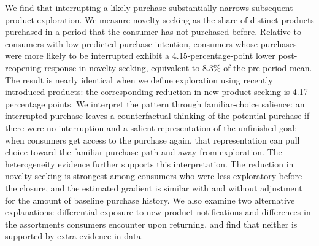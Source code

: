 \documentclass[11 pt]{article}
\begin{document}
We find that interrupting a likely purchase substantially narrows subsequent product exploration. We measure novelty-seeking as the share of distinct products purchased in a period that the consumer has not purchased before. Relative to consumers with low predicted purchase intention, consumers whose purchases were more likely to be interrupted exhibit a 4.15-percentage-point lower post-reopening response in novelty-seeking, equivalent to 8.3\% of the pre-period mean. The result is nearly identical when we define exploration using recently introduced products: the corresponding reduction in new-product-seeking is 4.17 percentage points. We interpret the pattern through familiar-choice salience: an interrupted purchase leaves a counterfactual thinking of the potential purchase if there were no interruption and a salient representation of the unfinished goal; when consumers get access to the purchase again, that representation can pull choice toward the familiar purchase path and away from exploration. The heterogeneity evidence further supports this interpretation. The reduction in novelty-seeking is strongest among consumers who were less exploratory before the closure, and the estimated gradient is similar with and without adjustment for the amount of baseline purchase history. We also examine two alternative explanations: differential exposure to new-product notifications and differences in the assortments consumers encounter upon returning, and find that neither is supported by extra evidence in data.
\end{document}
